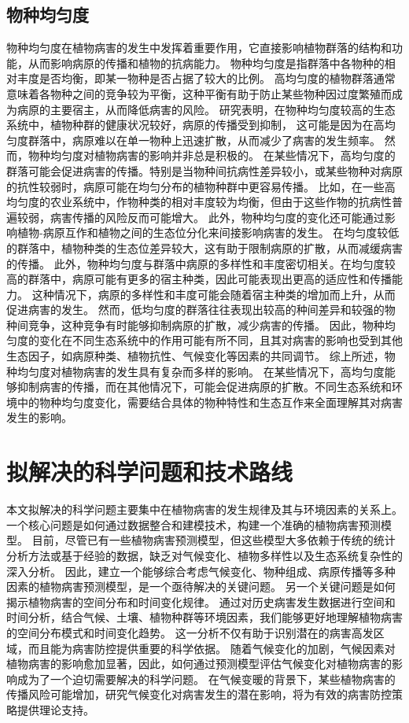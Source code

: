 \documentclass[AutoFakeBold]{LZUThesis-PgD&PhD}
\begin{document}
	\subsection{物种均匀度}
	物种均匀度在植物病害的发生中发挥着重要作用，它直接影响植物群落的结构和功能，从而影响病原的传播和植物的抗病能力。
	物种均匀度是指群落中各物种的相对丰度是否均衡，即某一物种是否占据了较大的比例。
	高均匀度的植物群落通常意味着各物种之间的竞争较为平衡，这种平衡有助于防止某些物种因过度繁殖而成为病原的主要宿主，从而降低病害的风险。
	研究表明，在物种均匀度较高的生态系统中，植物种群的健康状况较好，病原的传播受到抑制，
	这可能是因为在高均匀度群落中，病原难以在单一物种上迅速扩散，从而减少了病害的发生频率\cite{Mitchell2002}。
	然而，物种均匀度对植物病害的影响并非总是积极的。
	在某些情况下，高均匀度的群落可能会促进病害的传播。特别是当物种间抗病性差异较小，或某些物种对病原的抗性较弱时，病原可能在均匀分布的植物种群中更容易传播。
	比如，在一些高均匀度的农业系统中，作物种类的相对丰度较为均衡，但由于这些作物的抗病性普遍较弱，病害传播的风险反而可能增大\cite{Garrett2006}。
	此外，物种均匀度的变化还可能通过影响植物-病原互作和植物之间的生态位分化来间接影响病害的发生。
	在均匀度较低的群落中，植物种类的生态位差异较大，这有助于限制病原的扩散，从而减缓病害的传播。
	此外，物种均匀度与群落中病原的多样性和丰度密切相关。在均匀度较高的群落中，病原可能有更多的宿主种类，因此可能表现出更高的适应性和传播能力。
	这种情况下，病原的多样性和丰度可能会随着宿主种类的增加而上升，从而促进病害的发生\cite{Bever2010}。
	然而，低均匀度的群落往往表现出较高的种间差异和较强的物种间竞争，这种竞争有时能够抑制病原的扩散，减少病害的传播。
	因此，物种均匀度的变化在不同生态系统中的作用可能有所不同，且其对病害的影响也受到其他生态因子，如病原种类、植物抗性、气候变化等因素的共同调节。
	综上所述，物种均匀度对植物病害的发生具有复杂而多样的影响。
	在某些情况下，高均匀度能够抑制病害的传播，而在其他情况下，可能会促进病原的扩散。不同生态系统和环境中的物种均匀度变化，需要结合具体的物种特性和生态互作来全面理解其对病害发生的影响\cite{Pautasso2010,Maron2011}。
	
	
	\section{拟解决的科学问题和技术路线}
	本文拟解决的科学问题主要集中在植物病害的发生规律及其与环境因素的关系上。
	一个核心问题是如何通过数据整合和建模技术，构建一个准确的植物病害预测模型。
	目前，尽管已有一些植物病害预测模型，但这些模型大多依赖于传统的统计分析方法或基于经验的数据，缺乏对气候变化、植物多样性以及生态系统复杂性的深入分析。
	因此，建立一个能够综合考虑气候变化、物种组成、病原传播等多种因素的植物病害预测模型，是一个亟待解决的关键问题。
	另一个关键问题是如何揭示植物病害的空间分布和时间变化规律。
	通过对历史病害发生数据进行空间和时间分析，结合气候、土壤、植物种群等环境因素，我们能够更好地理解植物病害的空间分布模式和时间变化趋势。
	这一分析不仅有助于识别潜在的病害高发区域，而且能为病害防控提供重要的科学依据。
	随着气候变化的加剧，气候因素对植物病害的影响愈加显著，因此，如何通过预测模型评估气候变化对植物病害的影响成为了一个迫切需要解决的科学问题。
	在气候变暖的背景下，某些植物病害的传播风险可能增加，研究气候变化对病害发生的潜在影响，将为有效的病害防控策略提供理论支持。
	
\end{document}
